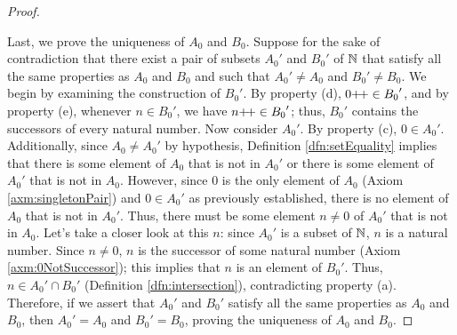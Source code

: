 \documentclass[../main.tex]{subfiles}
\begin{document}
\begin{enumerate}[ref={\thesection.\arabic*}]
\begin{proof}
\begin{enumerate}
        \end{enumerate}
        Last, we prove the uniqueness of $A_0$ and $B_0$. Suppose for the sake of contradiction that there exist a pair of subsets ${A_0}'$ and ${B_0}'$ of $\mathbb{N}$ that satisfy all the same properties as $A_0$ and $B_0$ and such that ${A_0}'\neq A_0$ and ${B_0}'\neq B_0$. We begin by examining the construction of ${B_0}'$. By property (d), $0{+\!+}\in{B_0}'$, and by property (e), whenever $n\in{B_0}'$, we have $n{+\!+}\in{B_0}'$; thus, ${B_0}'$ contains the successors of every natural number. Now consider ${A_0}'$. By property (c), $0\in{A_0}'$. Additionally, since $A_0\neq{A_0}'$ by hypothesis, Definition \ref{dfn:setEquality} implies that there is some element of $A_0$ that is not in ${A_0}'$ or there is some element of ${A_0}'$ that is not in $A_0$. However, since 0 is the only element of $A_0$ (Axiom \ref{axm:singletonPair}) and $0\in{A_0}'$ as previously established, there is no element of $A_0$ that is not in ${A_0}'$. Thus, there must be some element $n\neq 0$ of ${A_0}'$ that is not in $A_0$. Let's take a closer look at this $n$: since ${A_0}'$ is a subset of $\mathbb{N}$, $n$ is a natural number. Since $n\neq 0$, $n$ is the successor of some natural number (Axiom \ref{axm:0NotSuccessor}); this implies that $n$ is an element of ${B_0}'$. Thus, $n\in{A_0}'\cap{B_0}'$ (Definition \ref{dfn:intersection}), contradicting property (a). Therefore, if we assert that ${A_0}'$ and ${B_0}'$ satisfy all the same properties as $A_0$ and $B_0$, then ${A_0}'=A_0$ and ${B_0}'=B_0$, proving the uniqueness of $A_0$ and $B_0$.\par

\end{proof}
\end{enumerate}
\end{document}
